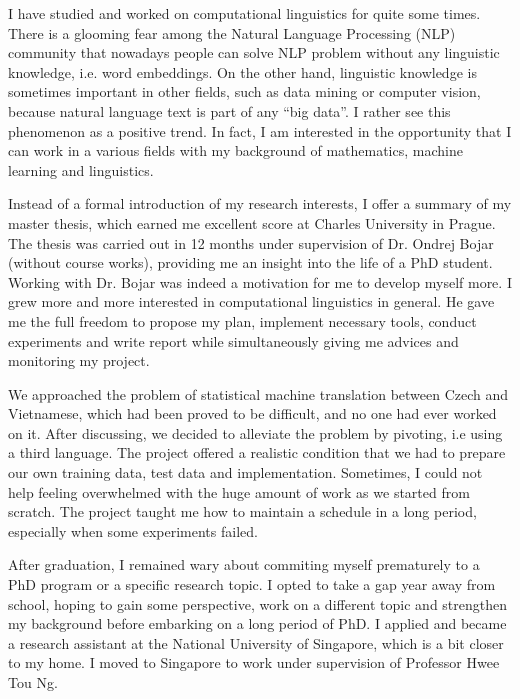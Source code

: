 \documentclass[a4paper, 12pt]{scrartcl}
\begin{document}

I have studied and worked on computational linguistics for quite some times. 
There is a glooming fear among the Natural Language Processing (NLP) community that nowadays people can solve NLP problem without any linguistic knowledge, i.e. word embeddings.
On the other hand, linguistic knowledge is sometimes important in other fields, such as data mining or computer vision, because natural language text is part of any ``big data''. 
I rather see this phenomenon as a positive trend. 
In fact, I am interested in the opportunity that I can work in a various fields with my background of mathematics, machine learning and linguistics. 


Instead of a formal introduction of my research interests, I offer a summary of my master thesis, which earned me excellent score at Charles University in Prague. 
The thesis was carried out in 12 months under supervision of Dr. Ondrej Bojar (without course works), providing me an insight into the life of a PhD student.
Working with Dr. Bojar was indeed a motivation for me to develop myself more. I grew more and more interested in computational linguistics in general. 
He gave me the full freedom to propose my plan, implement necessary tools, conduct experiments and write report while simultaneously giving me advices and monitoring my project. 

We approached the problem of statistical machine translation between Czech and Vietnamese, which had been proved to be difficult, and no one had ever worked on it.
After discussing, we decided to alleviate the problem by pivoting, i.e using a third language. 
The project offered a realistic condition that we had to prepare our own training data, test data and implementation.
Sometimes, I could not help feeling overwhelmed with the huge amount of work as we started from scratch.
The project taught me how to maintain a schedule in a long period, especially when some experiments failed.



After graduation, I remained wary about commiting myself prematurely to a PhD program or a specific research topic. 
I opted to take a gap year away from school, hoping to gain some perspective, work on a different topic and strengthen my background before embarking on a long period of PhD.
I applied and became a research assistant at the National University of Singapore, which is a bit closer to my home.
I moved to Singapore to work under supervision of Professor Hwee Tou Ng.  
\end{document}
